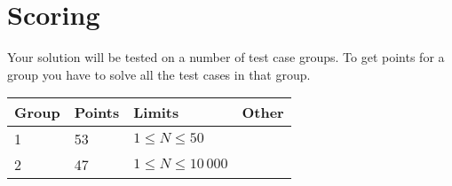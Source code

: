 \section*{Scoring}
Your solution will be tested on a number of test case groups. To get points for a group
you have to solve all the test cases in that group.

\begin{tabular}{| l | l | l | l |}
\hline
Group & Points & Limits & Other \\ \hline
1     & 53         &  $1 \le N \le 50$ & \\ \hline
2     & 47         &  $1 \le N \le 10\,000$ & \\ \hline
\end{tabular}
